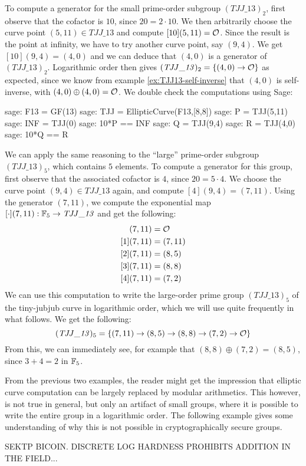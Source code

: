\begin{example}
To compute a generator for the small prime-order subgroup $(\mathit{TJJ\_13})_2$, first observe that the cofactor is $10$, since $20=2\cdot 10$. We then arbitrarily choose the curve point $(5,11)\in \mathit{TJJ\_13}$ and compute $[10](5,11)=\mathcal{O}$. Since the result is the point at infinity, we have to try another curve point, say $(9,4)$. We get $[10](9,4)=(4,0)$ and we can deduce that $(4,0)$ is a generator of $(\mathit{TJJ\_13})_2$. Logarithmic order then gives
$(\mathit{TJJ\_13})_2 = \{(4,0)\to \mathcal{O}\}$
as expected, since we know from example \ref{ex:TJJ13-self-inverse} that $(4,0)$ is self-inverse, with $(4,0)\oplus (4,0)=\mathcal{O}$. We double check the computations using Sage: 
\begin{sagecommandline}
sage: F13 = GF(13)
sage: TJJ = EllipticCurve(F13,[8,8])
sage: P = TJJ(5,11)
sage: INF = TJJ(0)
sage: 10*P == INF
sage: Q = TJJ(9,4)
sage: R = TJJ(4,0)
sage: 10*Q == R
\end{sagecommandline}
We can apply the same reasoning to the ``large'' prime-order subgroup $(\mathit{TJJ\_13})_5$, which contains $5$ elements. To compute a generator for this group, first observe that the associated cofactor is $4$, since $20=5\cdot 4$. We choose the curve point $(9,4)\in \mathit{TJJ\_13}$ again, and compute $[4](9,4)=(7,11)$.  Using the generator $(7,11)$, we compute the exponential map $[\cdot](7,11): \mathbb{F}_5 \to \mathit{TJJ\_13}$ and get the following:
\begin{align*}
[0](7,11) &= \Oinf\\
[1](7,11) &= (7,11)\\
[2](7,11) &= (8,5)\\
[3](7,11) &= (8,8)\\
[4](7,11) &= (7,2)
\end{align*}
We can use this computation to write the large-order prime group $(\mathit{TJJ\_13})_5$ of the tiny-jubjub curve in logarithmic order, which we will use quite frequently in what follows. We get the following:
\begin{equation}\label{eq:TJJ13-logarithmic-order}
(\mathit{TJJ\_13})_5 = \{(7,11)\to(8,5)\to(8,8)\to(7,2)\to \mathcal{O}\}
\end{equation}
From this, we can immediately see, for example that  $(8,8)\oplus (7,2)= (8,5)$, since 
$3+4=2$ in $\mathbb{F}_5$.
\end{example}
From the previous two examples, the reader might get the impression that elliptic curve computation can be largely replaced by modular arithmetics. This however, is not true in general, but only an artifact of small groups, where it is possible to write the entire group in a logarithmic order. The following example gives some understanding of why this is not possible in cryptographically secure groups.
\begin{example}
SEKTP BICOIN. DISCRETE LOG HARDNESS PROHIBITS ADDITION IN THE FIELD...
\end{example}
